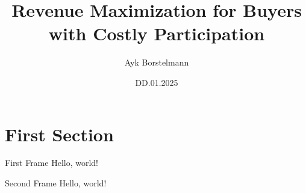 \documentclass{beamer}
\title{Revenue Maximization for Buyers with Costly Participation}
\date{DD.01.2025}
\author{Ayk Borstelmann}
\institute{
    Seminar Algorithmic Game Theory
}
\begin{document}
  \maketitle
  \section{First Section}
  \begin{frame}{First Frame}
    Hello, world!
  \end{frame}
  \begin{frame}{Second Frame}
    Hello, world!
  \end{frame}
\end{document}
